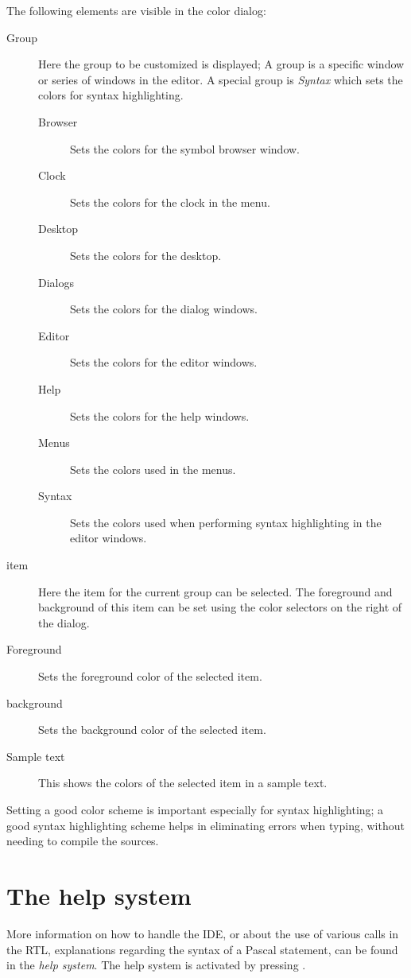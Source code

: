 The following elements are visible in the color dialog:
\begin{description}
\item[Group]
Here the group to be customized is displayed; A group is a specific window
or series of windows in the editor. A special group is {\em Syntax} which
sets the colors for syntax highlighting.
\begin{description}
\item[Browser] Sets the colors for the symbol browser window.
\item[Clock] Sets the colors for the clock in the menu.
\item[Desktop] Sets the colors for the desktop.
\item[Dialogs] Sets the colors for the dialog windows.
\item[Editor] Sets the colors for the editor windows.
\item[Help] Sets the colors for the help windows.
\item[Menus] Sets the colors used in the menus.
\item[Syntax] Sets the colors used when performing syntax highlighting in the
editor windows.
\end{description}
\item[item]
Here the item for the current group can be selected. The foreground and
background of this item can be set using the color selectors on the right of
the dialog.
\item[Foreground]
Sets the foreground color of the selected item.
\item[background]
Sets the background color of the selected item.
\item[Sample text]
This shows the colors of the selected item in a sample text.
\end{description}
Setting a good color scheme is important especially for syntax highlighting;
a good syntax highlighting scheme helps in eliminating errors when typing,
without needing to compile the sources.

\section{The help system}

More information on how to handle the IDE, or about the use of various
calls in the RTL, explanations regarding the syntax of a Pascal statement,
can be found in the \emph{help system}. The help system is activated
by pressing .

